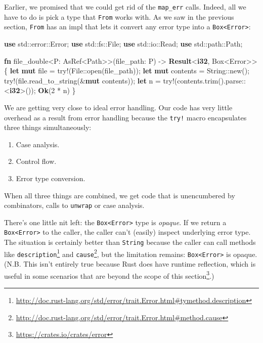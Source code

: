 \documentclass[a4paper,]{book}
\newenvironment{Shaded}{\begin{snugshade}}{\end{snugshade}}
\newcommand{\KeywordTok}[1]{\textcolor[rgb]{0.13,0.29,0.53}{\textbf{{#1}}}}
\newcommand{\DecValTok}[1]{\textcolor[rgb]{0.00,0.00,0.81}{{#1}}}
\newcommand{\OtherTok}[1]{\textcolor[rgb]{0.56,0.35,0.01}{{#1}}}
\newcommand{\NormalTok}[1]{{#1}}
\renewcommand{\href}[2]{#2\footnote{\url{#1}}}
\begin{document}
Earlier, we promised that we could get rid of the \texttt{map\_err}
calls. Indeed, all we have to do is pick a type that \texttt{From} works
with. As we saw in the previous section, \texttt{From} has an impl that
lets it convert any error type into a
\texttt{Box\textless{}Error\textgreater{}}:

\begin{Shaded}
\begin{Highlighting}[]
\KeywordTok{use} \NormalTok{std::error::Error;}
\KeywordTok{use} \NormalTok{std::fs::File;}
\KeywordTok{use} \NormalTok{std::io::Read;}
\KeywordTok{use} \NormalTok{std::path::Path;}

\KeywordTok{fn} \NormalTok{file_double<P: AsRef<Path>>(file_path: P) -> }\KeywordTok{Result}\NormalTok{<}\KeywordTok{i32}\NormalTok{, Box<Error>> \{}
    \KeywordTok{let} \KeywordTok{mut} \NormalTok{file = }\OtherTok{try!}\NormalTok{(File::open(file_path));}
    \KeywordTok{let} \KeywordTok{mut} \NormalTok{contents = String::new();}
    \OtherTok{try!}\NormalTok{(file.read_to_string(&}\KeywordTok{mut} \NormalTok{contents));}
    \KeywordTok{let} \NormalTok{n = }\OtherTok{try!}\NormalTok{(contents.trim().parse::<}\KeywordTok{i32}\NormalTok{>());}
    \KeywordTok{Ok}\NormalTok{(}\DecValTok{2} \NormalTok{* n)}
\NormalTok{\}}
\end{Highlighting}
\end{Shaded}

We are getting very close to ideal error handling. Our code has very
little overhead as a result from error handling because the
\texttt{try!} macro encapsulates three things simultaneously:

\begin{enumerate}
\def\labelenumi{\arabic{enumi}.}
\itemsep1pt\parskip0pt
\item
  Case analysis.
\item
  Control flow.
\item
  Error type conversion.
\end{enumerate}

When all three things are combined, we get code that is unencumbered by
combinators, calls to \texttt{unwrap} or case analysis.

There's one little nit left: the
\texttt{Box\textless{}Error\textgreater{}} type is \emph{opaque}. If we
return a \texttt{Box\textless{}Error\textgreater{}} to the caller, the
caller can't (easily) inspect underlying error type. The situation is
certainly better than \texttt{String} because the caller can call
methods like
\href{http://doc.rust-lang.org/std/error/trait.Error.html\#tymethod.description}{\texttt{description}}
and
\href{http://doc.rust-lang.org/std/error/trait.Error.html\#method.cause}{\texttt{cause}},
but the limitation remains: \texttt{Box\textless{}Error\textgreater{}}
is opaque. (N.B. This isn't entirely true because Rust does have runtime
reflection, which is useful in some scenarios that are
\href{https://crates.io/crates/error}{beyond the scope of this
section}.)
\end{document}
